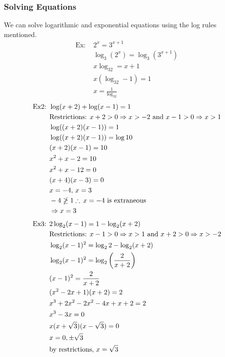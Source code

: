 \documentclass[11pt, fleqn]{article}
\begin{document}
\subsubsection{Solving Equations}
We can solve logarithmic and exponential equations using the log rules mentioned.
\begin{align*}
    \text{Ex: }&2^x=3^{x+1}\\
    &\log_3(2^x)=\log_3(3^{x+1})\\
    &x\log_32=x+1\\
    &x(\log_32-1)=1\\
    &x=\frac{1}{\log_32}
\end{align*}
\begin{align*}
    \text{Ex2: }&\log(x+2)+\log(x-1)=1\\
    &\text{Restrictions: }x+2>0\Rightarrow x>-2\text{ and }x-1>0\Rightarrow x>1\\
    &\log((x+2)(x-1))=1\\
    &\log((x+2)(x-1))=\log10\\
    &(x+2)(x-1)=10\\
    &x^2+x-2=10\\
    &x^2+x-12=0\\
    &(x+4)(x-3)=0\\
    &x=-4,\,x=3\\
    &-4\ngeq 1\therefore\,x=-4\text{ is extraneous}\\
    &\Rightarrow x=3
\end{align*}
\begin{align*}
    \text{Ex3: }&2\log_2(x-1)=1-\log_2(x+2)\\
    &\text{Restrictions: }x-1>0\Rightarrow x>1\text{ and }x+2>0\Rightarrow x>-2\\
    &\log_2(x-1)^2=\log_22-\log_2(x+2)\\
    &\log_2(x-1)^2=\log_2\left(\frac{2}{x+2}\right)\\
    &(x-1)^2=\frac{2}{x+2}\\
    &(x^2-2x+1)(x+2)=2\\
    &x^3+2x^2-2x^2-4x+x+2=2\\
    &x^3-3x=0\\
    &x(x+\sqrt{3})(x-\sqrt{3})=0\\
    &x=0,\pm\sqrt{3}\\
    &\text{by restrictions, }x=\sqrt{3}
\end{align*}
\end{document}
